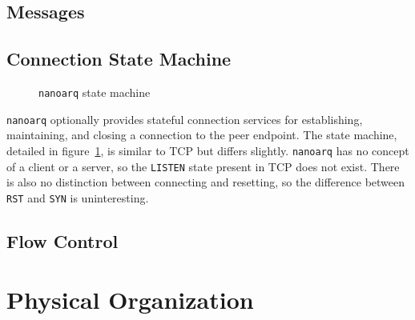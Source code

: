 \documentclass[11pt]{article}
\newcommand{\nanoarq}{\texttt{nanoarq}}
\begin{document}
\subsection{Messages}
\subsection{Connection State Machine}
\begin{figure}

\caption{\nanoarq{} state machine}
\label{fig:state-machine}
\end{figure}
\nanoarq{} optionally provides stateful connection services for establishing, maintaining, and closing a connection to the peer endpoint. The state machine, detailed in figure~\ref{fig:state-machine}, is similar to TCP but differs slightly. \nanoarq{} has no concept of a client or a server, so the \texttt{LISTEN} state present in TCP does not exist. There is also no distinction between connecting and resetting, so the difference between \texttt{RST} and \texttt{SYN} is uninteresting.

\subsection{Flow Control}

\section{Physical Organization}
\end{document}
